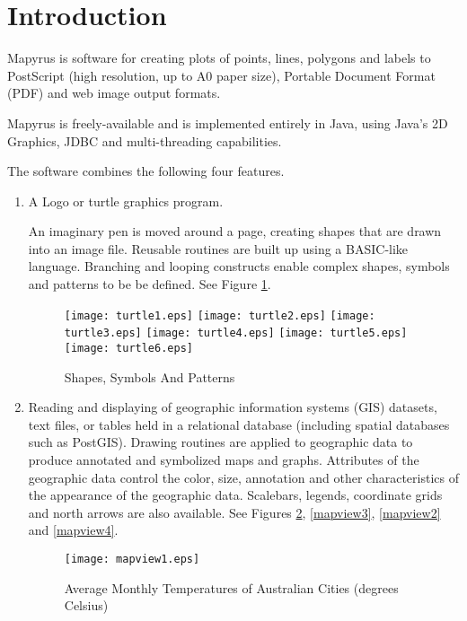 
\section{Introduction}

Mapyrus is software for
creating plots of points, lines, polygons and labels 
to PostScript (high resolution, up to A0 paper size),
Portable Document Format (PDF) and web image output formats.

Mapyrus is freely-available and is implemented entirely in Java,
using Java's 2D Graphics, JDBC and multi-threading capabilities.

The software combines the following four features.

\begin{enumerate}
\item

A Logo or turtle graphics program.

An imaginary pen is moved around a page,
creating shapes that are drawn into an image file.
Reusable routines are built up using a BASIC-like language.
Branching and looping constructs enable complex shapes, symbols and patterns
to be be defined.  See Figure \ref{turtle}.

\begin{figure}[htb]
\texttt{[image: turtle1.eps]}
\texttt{[image: turtle2.eps]}
\texttt{[image: turtle3.eps]}
\texttt{[image: turtle4.eps]}
\texttt{[image: turtle5.eps]}
\texttt{[image: turtle6.eps]}
\caption{Shapes, Symbols And Patterns}
\label{turtle}
\end{figure}

\item

Reading and displaying of geographic information
systems (GIS) datasets, text files, or tables held in a relational database
(including spatial databases such as PostGIS).
Drawing routines are applied to geographic data to produce annotated and
symbolized maps and graphs.  Attributes of the geographic data control
the color, size, annotation and other characteristics of the
appearance of the geographic data.
Scalebars, legends, coordinate grids and north arrows are also available.
See Figures \ref{mapview1}, \ref{mapview3}, \ref{mapview2} and
\ref{mapview4}.

\begin{figure}
\texttt{[image: mapview1.eps]}
\caption[Average Monthly Temperatures]{Average Monthly Temperatures of Australian Cities (degrees Celsius)}
\label{mapview1}
\end{figure}


\end{enumerate}
